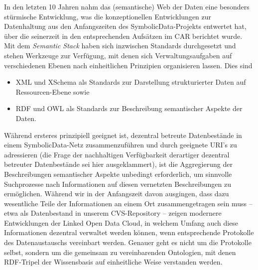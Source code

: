 \documentclass{article}
\newcommand{\SD}{{\sc Symbolic\-Data}}
\begin{document}
In den letzten 10 Jahren nahm das (semantische) Web der Daten eine besonders
stürmische Entwicklung, was die konzeptionellen Entwicklungen zur Datenhaltung
aus den Anfangszeiten des \SD-Projekts entwertet hat, über die seinerzeit in
den entsprechenden Aufsätzen im CAR berichtet wurde.  Mit dem \emph{Semantic
  Stack} haben sich inzwischen Standards durchgesetzt und stehen Werkzeuge zur
Verfügung, mit denen sich Verwaltungsaufgaben auf verschiedenen Ebenen nach
einheitlichen Prinzipien organisieren lassen. Dies sind 
\begin{itemize}
\item XML und XSchema als Standards zur Darstellung strukturierter Daten auf
  Ressourcen-Ebene sowie 
\item RDF und OWL als Standards zur Beschreibung semantischer Aspekte der
  Daten.
\end{itemize}
Während ersteres prinzipiell geeignet ist, dezentral betreute Datenbestände in
einem \SD-Netz zusammenzuführen und durch geeignete URI's zu adressieren (die
Frage der nachhaltigen Verfügbarkeit derartiger dezentral betreuter
Datenbestände sei hier ausgeklammert), ist die Aggregierung der Beschreibungen
semantischer Aspekte unbedingt erforderlich, um sinnvolle Suchprozesse nach
Informationen auf diesen vernetzten Beschreibungen zu ermöglichen.  Während
wir in der Anfangszeit davon ausgingen, dass dazu wesentliche Teile der
Informationen an einem Ort zusammengetragen sein muss -- etwa als Datenbestand
in unserem CVS-Repository -- zeigen modernere Entwicklungen der Linked Open
Data Cloud, in welchem Umfang auch diese Informationen dezentral verwaltet
werden können, wenn entsprechende Protokolle des Datenaustauschs vereinbart
werden. Genauer geht es nicht um die Protokolle selbst, sondern um die
gemeinsam zu vereinbarenden Ontologien, mit denen RDF-Tripel der Wissensbasis
auf einheitliche Weise {\glqq}verstanden{\grqq} werden.
\end{document}

